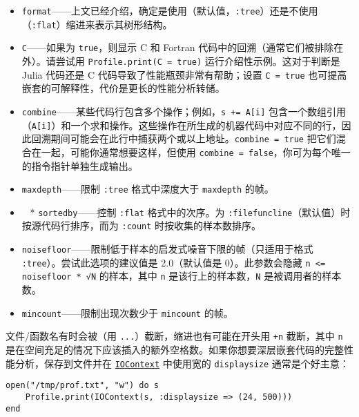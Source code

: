 \begin{itemize}
\item \texttt{format}——上文已经介绍，确定是使用（默认值，\texttt{:tree}）还是不使用（\texttt{:flat}）缩进来表示其树形结构。


\item \texttt{C}——如果为 \texttt{true}，则显示 C 和 Fortran 代码中的回溯（通常它们被排除在外）。请尝试用 \texttt{Profile.print(C = true)} 运行介绍性示例。这对于判断是 Julia 代码还是 C 代码导致了性能瓶颈非常有帮助；设置 \texttt{C = true} 也可提高嵌套的可解释性，代价是更长的性能分析转储。


\item \texttt{combine}——某些代码行包含多个操作；例如，\texttt{s += A[i]} 包含一个数组引用（\texttt{A[i]}）和一个求和操作。这些操作在所生成的机器代码中对应不同的行，因此回溯期间可能会在此行中捕获两个或以上地址。\texttt{combine = true} 把它们混合在一起，可能你通常想要这样，但使用 \texttt{combine = false}，你可为每个唯一的指令指针单独生成输出。


\item \texttt{maxdepth}——限制 \texttt{:tree} 格式中深度大于 \texttt{maxdepth} 的帧。


\item   * \texttt{sortedby}——控制 \texttt{:flat} 格式中的次序。为 \texttt{:filefuncline}（默认值）时按源代码行排序，而为 \texttt{:count} 时按收集的样本数排序。


\item \texttt{noisefloor}——限制低于样本的启发式噪音下限的帧（只适用于格式 \texttt{:tree}）。尝试此选项的建议值是 2.0（默认值是 0）。此参数会隐藏 \texttt{n <= noisefloor * √N} 的样本，其中 \texttt{n} 是该行上的样本数，\texttt{N} 是被调用者的样本数。


\item \texttt{mincount}——限制出现次数少于 \texttt{mincount} 的帧。

\end{itemize}


文件/函数名有时会被（用 \texttt{...}）截断，缩进也有可能在开头用 \texttt{+n} 截断，其中 \texttt{n} 是在空间充足的情况下应该插入的额外空格数。如果你想要深层嵌套代码的完整性能分析，保存到文件并在 \hyperlink{13454403377667762339}{\texttt{IOContext}} 中使用宽的 \texttt{displaysize} 通常是个好主意：




\begin{verbatim}
open("/tmp/prof.txt", "w") do s
    Profile.print(IOContext(s, :displaysize => (24, 500)))
end
\end{verbatim}




